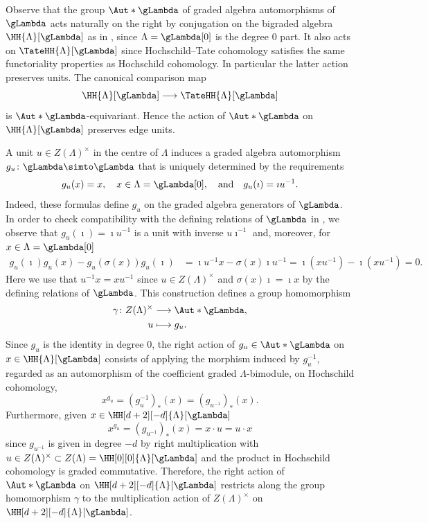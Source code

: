 \documentclass[a4paper]{amsart}
\begin{document}
\begin{remark}
  \label{rmk:action}
  Observe that the group $\Aut*{\gLambda}$ of graded algebra automorphisms of
  $\gLambda$ acts naturally on the right by conjugation on the bigraded algebra
  $\HH{\Lambda}[\gLambda]$ as in ,
  since $\Lambda=\gLambda[0]$ is the degree $0$ part. It also acts on
  $\TateHH{\Lambda}[\gLambda]$ since Hochschild--Tate cohomology satisfies the
  same functoriality properties as Hochschild cohomology. In particular the
  latter action preserves units. The canonical comparison map
  \[\HH{\Lambda}[\gLambda]\longrightarrow\TateHH{\Lambda}[\gLambda]\]
  is $\Aut*{\gLambda}$-equivariant. Hence the action of $\Aut*{\gLambda}$ on $\HH{\Lambda}[\gLambda]$ preserves edge units.

  A unit $u\in Z(\Lambda)^\times$ in the centre of $\Lambda$ induces a
  graded algebra automorphism $g_u\colon\gLambda\simto\gLambda$ that is uniquely
  determined by the requirements
  \[
    g_u(x)=x, \quad x\in\Lambda=\gLambda[0],\quad\text{and}\quad g_u(\imath)=\imath u^{-1}.
  \]
 Indeed, these formulas define $g_u$ on the graded algebra generators of $\gLambda$. In order to check compatibility with the defining relations of $\gLambda$ in , we observe that $g_u(\imath)=\imath u^{-1}$ is a unit with inverse $u\imath^{-1}$ and, moreover, for $x\in\Lambda=\gLambda[0]$
 \begin{align*}
 	g_u(\imath)g_u(x)-g_u(\sigma(x))g_u(\imath)&= \imath u^{-1}x-\sigma(x) \imath u^{-1}
 	= \imath (x u^{-1})-\imath (x u^{-1})=0.
 \end{align*}
 Here we use that $u^{-1} x=x u^{-1}$ since $u\in Z(\Lambda)^\times$ and $\sigma(x)\imath =\imath x$ by the defining relations of $\gLambda$.
 This construction defines a group homomorphism
 \begin{align*}
   \gamma\colon Z(\Lambda)^\times&\longrightarrow\Aut*{\gLambda},\\
   u&\longmapsto g_u.
 \end{align*}
 Since $g_u$ is the identity in degree $0$, the right action of $g_u\in \Aut*{\gLambda}$ on $x\in\HH{\Lambda}[\gLambda]$ consists of applying the morphism induced by $g_u^{-1}$, regarded as an automorphism of the coefficient graded $\Lambda$-bimodule, on Hochschild cohomology, 
 \[x^{g_u}=(g_u^{-1})_*(x)=(g_{u^{-1}})_*(x).\]
Furthermore, given $x\in\HH[d+2][-d]{\Lambda}[\gLambda]$
\[x^{g_u}=(g_{u^{-1}})_*(x)=x\cdot u=u\cdot x\]
since $g_{u^{-1}}$ is given in degree $-d$ by right multiplication with $u\in Z(\Lambda)^\times\subset Z(\Lambda)=\HH[0][0]{\Lambda}[\gLambda]$ and the product in Hochschild cohomology is graded commutative. Therefore, the right action of $\Aut*{\gLambda}$ on $\HH[d+2][-d]{\Lambda}[\gLambda]$ restricts along the group homomorphism $\gamma$ to the multiplication action of $Z(\Lambda)^\times$ on $\HH[d+2][-d]{\Lambda}[\gLambda]$.
\end{remark}
\end{document}
